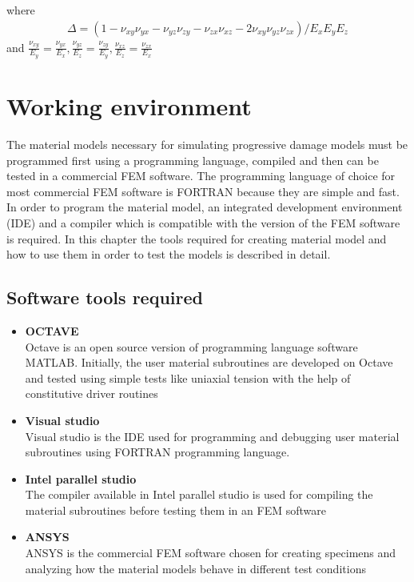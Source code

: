 \documentclass[a4paper,12pt]{extarticle}
\begin{document}
 where 
 \begin{align*}
 \Delta = (1 - \nu_{xy}\nu_{yx} - \nu_{yz}\nu_{zy} - \nu_{zx}\nu_{xz} - 2\nu_{xy}\nu_{yz}\nu_{zx})/E_{x}E_{y}E_{z}
 \end{align*}
   and  $\frac{\nu_{xy}}{E_{y}} = \frac{\nu_{yx}}{E_{x}}, \frac{\nu_{yz}}{E_{z}} = \frac{\nu_{zy}}{E_{y}}, \frac{\nu_{xz}}{E_{z}} = \frac{\nu_{zx}}{E_{x}}$ 



\newpage
\vspace*{2cm}
\section{Working environment}
\vspace*{1cm}
\indent\indent\indent  The material models necessary for simulating progressive damage models must be programmed first using a programming language, compiled and then can be tested in a commercial FEM software. The programming language of choice for most commercial FEM software is FORTRAN because they are simple and fast. In order to program the material model, an integrated development environment (IDE) and a compiler which is compatible with the version of the FEM software is required. In this chapter the tools required for creating material model and how to use them in order to test the models is described in detail.  
\vspace*{1cm}
\subsection{Software tools required}
\begin{itemize}
\item \textbf{OCTAVE}\\ \indent
\hspace*{13mm} Octave is an open source version of programming language software MATLAB. Initially, the user material subroutines are developed on Octave and tested using simple tests like uniaxial tension with the help of constitutive driver routines
\item \textbf{Visual studio }\\
\hspace*{13mm} Visual studio is the IDE used for programming and debugging user material subroutines using FORTRAN programming language.
\item \textbf{Intel parallel studio}\\
\hspace*{13mm} The compiler available in Intel parallel studio is used for compiling the material subroutines before testing them in an FEM software
\item \textbf{ANSYS }\\
\hspace*{13mm}ANSYS is the commercial FEM software chosen for creating specimens and analyzing how the material models behave in different test conditions
\end{itemize}
\end{document}

